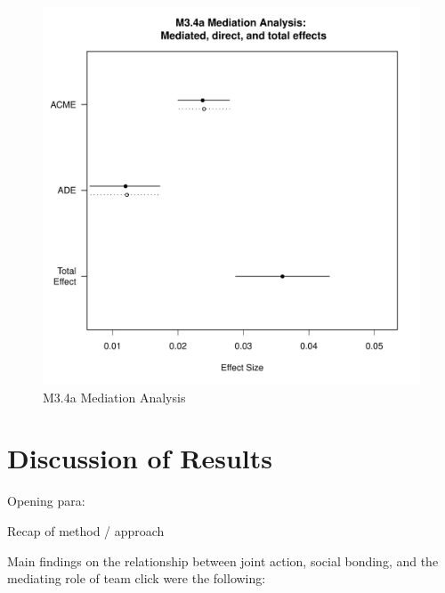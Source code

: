 \begin{CJK}{UTF8}{gbsn}
    \begin{figure}[htbp]
      \includegraphics[scale=.5]{images/MLM34aMediationAnalysis.pdf}
      \caption{M3.4a Mediation Analysis}
      \label{fig:MLM34aMediationAnalysis}
    \end{figure}



\clearpage























\clearpage

\section{Discussion of Results}

Opening para:

Recap of method / approach


Main findings on the relationship between joint action, social bonding, and the mediating role of team click were the following:







\end{CJK}
